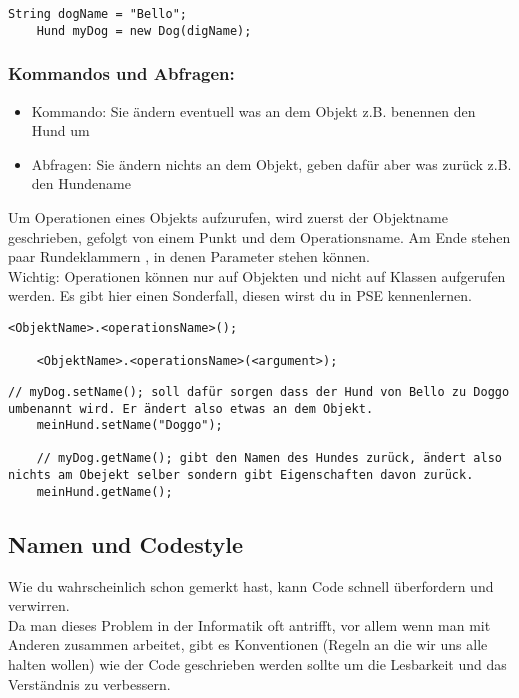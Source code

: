 \begin{lstlisting}[title=\textbf{Beispiel: Variable}]
	String dogName = "Bello";
	Hund myDog = new Dog(digName);
\end{lstlisting}

\begin{Infobox}
	\subsubsection*{Kommandos und Abfragen:}
	\begin{itemize}
		\item Kommando: Sie ändern eventuell was an dem Objekt z.B. benennen den Hund um
		\item Abfragen: Sie ändern nichts an dem Objekt, geben dafür aber was zurück z.B. den Hundename
	\end{itemize}
	Um Operationen eines Objekts aufzurufen, wird zuerst der Objektname geschrieben, gefolgt von einem Punkt und dem Operationsname.
	Am Ende stehen paar Rundeklammern \q{()}, in denen Parameter stehen können.\\
	{\color{red} Wichtig: } Operationen können nur auf Objekten und nicht auf Klassen aufgerufen werden.
	Es gibt hier einen Sonderfall, diesen wirst du in PSE kennenlernen.
\end{Infobox}

\begin{lstlisting}[title=\textbf{Kommando/Abfrage Syntax}]
	<ObjektName>.<operationsName>();

	<ObjektName>.<operationsName>(<argument>);
\end{lstlisting}

\begin{lstlisting}[title=\textbf{Beispiel: Kommando/Abfrage}]
	// myDog.setName(); soll dafür sorgen dass der Hund von Bello zu Doggo umbenannt wird. Er ändert also etwas an dem Objekt.
	meinHund.setName("Doggo");

	// myDog.getName(); gibt den Namen des Hundes zurück, ändert also nichts am Obejekt selber sondern gibt Eigenschaften davon zurück.
	meinHund.getName();
\end{lstlisting}

\subsection*{Namen und Codestyle}
Wie du wahrscheinlich schon gemerkt hast, kann Code schnell überfordern und verwirren.\\
Da man dieses Problem in der Informatik oft antrifft, vor allem wenn man mit Anderen zusammen arbeitet, gibt es Konventionen (Regeln an die wir uns alle halten wollen) wie der Code geschrieben werden sollte um die Lesbarkeit und das Verständnis zu verbessern.

